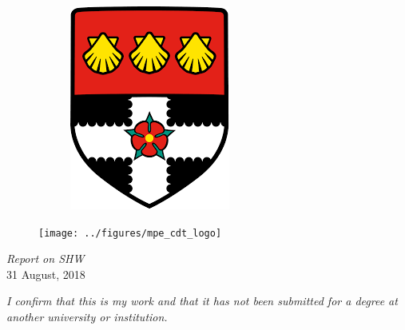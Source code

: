\documentclass[12pt,a4paper]{article}
\numberwithin{equation}{section}
\theoremstyle{definition}
\begin{document}
\begin{titlepage}
\begin{figure}[H]
\begin{subfigure}[b]{.1263\linewidth}
				\includegraphics[width=\linewidth]{../figures/uor_logo_big}
				\label{uor_logo_big}
			\end{subfigure}
			\centering
		\end{figure}
	\vspace{-14mm}
		\begin{figure}[H]
			\texttt{[image: ../figures/mpe\_cdt\_logo]}
			\centering
		\end{figure}
		\vfill %
		\textit{Report on SHW\\} %
		31 August, 2018 %
		
		
	\end{titlepage}
\pagebreak
\thispagestyle{empty}
\emph{I confirm that this is my work and that it has not been submitted for a degree at another university or institution.\\}
\emph{\\}
\emph{\\}
	\vspace{1\baselineskip} 
\pagebreak
\pagebreak
\thispagestyle{empty}
\tableofcontents
\end{document}
